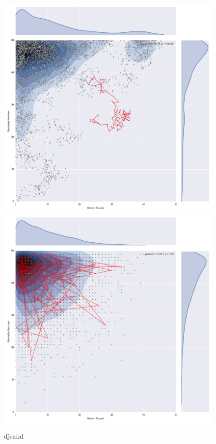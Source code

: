 \documentclass[12pt]{article}
\begin{document}
\clearpage
\begin{figure}[!ht]
	\centering
	\includegraphics[width=0.7\columnwidth]{out/T8_23/MH/plot/joint_scatter_plot} \\
	\includegraphics[width=0.7\columnwidth]{out/T8_23/Gibbs/plot/joint_scatter_plot} \\
	\caption{djsalıd}
	\label{dmaçsd}
\end{figure}
\end{document}
